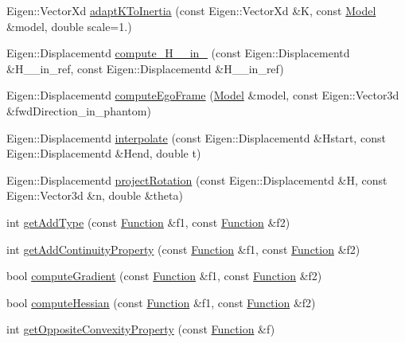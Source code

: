 \begin{DoxyCompactItemize}
\item 
Eigen\+::\+Vector\+Xd \hyperlink{namespaceocra_1_1utils_ad8e0359ef8aba5d4f7de70014e9ab324}{adapt\+K\+To\+Inertia} (const Eigen\+::\+Vector\+Xd \&K, const \hyperlink{classocra_1_1Model}{Model} \&model, double scale=1.)
\item 
Eigen\+::\+Displacementd \hyperlink{namespaceocra_1_1utils_a9158ce8ea082d7620fd3204979c75c09}{compute\+\_\+\+H\+\_\+\_\+in\+\_} (const Eigen\+::\+Displacementd \&H\+\_\+\_\+in\+\_\+ref, const Eigen\+::\+Displacementd \&H\+\_\+\_\+in\+\_\+ref)
\item 
Eigen\+::\+Displacementd \hyperlink{namespaceocra_1_1utils_a54960ab215262788c23ca1eee8786b5a}{compute\+Ego\+Frame} (\hyperlink{classocra_1_1Model}{Model} \&model, const Eigen\+::\+Vector3d \&fwd\+Direction\+\_\+in\+\_\+phantom)
\item 
Eigen\+::\+Displacementd \hyperlink{namespaceocra_1_1utils_a8d939e7ed429dffde760d84e41258940}{interpolate} (const Eigen\+::\+Displacementd \&Hstart, const Eigen\+::\+Displacementd \&Hend, double t)
\item 
Eigen\+::\+Displacementd \hyperlink{namespaceocra_1_1utils_a0c4be9b19e14fb7dfb9ae92650267dba}{project\+Rotation} (const Eigen\+::\+Displacementd \&H, const Eigen\+::\+Vector3d \&n, double \&theta)
\item 
int \hyperlink{namespaceocra_1_1utils_a71c5c6a8257c9a5bc5cc84e9a4fc2e68}{get\+Add\+Type} (const \hyperlink{classocra_1_1Function}{Function} \&f1, const \hyperlink{classocra_1_1Function}{Function} \&f2)
\item 
int \hyperlink{namespaceocra_1_1utils_a176daae05084971fbcba56c06170cb25}{get\+Add\+Continuity\+Property} (const \hyperlink{classocra_1_1Function}{Function} \&f1, const \hyperlink{classocra_1_1Function}{Function} \&f2)
\item 
bool \hyperlink{namespaceocra_1_1utils_a02a6c3a9f1fe61b2ae034dee1b75a795}{compute\+Gradient} (const \hyperlink{classocra_1_1Function}{Function} \&f1, const \hyperlink{classocra_1_1Function}{Function} \&f2)
\item 
bool \hyperlink{namespaceocra_1_1utils_a3fba5c6f77b54b0eee4cdd49f7991957}{compute\+Hessian} (const \hyperlink{classocra_1_1Function}{Function} \&f1, const \hyperlink{classocra_1_1Function}{Function} \&f2)
\item 
int \hyperlink{namespaceocra_1_1utils_a7a11f7cb798c473b72d7677b83ed859e}{get\+Opposite\+Convexity\+Property} (const \hyperlink{classocra_1_1Function}{Function} \&f)
\item 

\end{DoxyCompactItemize}
